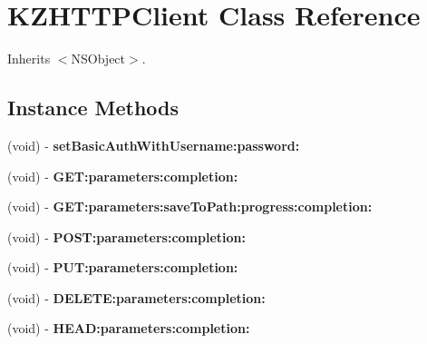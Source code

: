 \hypertarget{interface_k_z_h_t_t_p_client}{\section{K\-Z\-H\-T\-T\-P\-Client Class Reference}
\label{interface_k_z_h_t_t_p_client}
}


Inherits $<$\-N\-S\-Object$>$.

\subsection*{Instance Methods}
\begin{DoxyCompactItemize}
\item 
\hypertarget{interface_k_z_h_t_t_p_client_a88ab431831ad223ab18cbaf95ec7cd7b}{(void) -\/ {\bfseries set\-Basic\-Auth\-With\-Username\-:password\-:}}\label{interface_k_z_h_t_t_p_client_a88ab431831ad223ab18cbaf95ec7cd7b}

\item 
\hypertarget{interface_k_z_h_t_t_p_client_afbcc409f42547d924bf47516f063fa0b}{(void) -\/ {\bfseries G\-E\-T\-:parameters\-:completion\-:}}\label{interface_k_z_h_t_t_p_client_afbcc409f42547d924bf47516f063fa0b}

\item 
\hypertarget{interface_k_z_h_t_t_p_client_a887fe1ad9a5c125fc4b4403c4dc73a7f}{(void) -\/ {\bfseries G\-E\-T\-:parameters\-:save\-To\-Path\-:progress\-:completion\-:}}\label{interface_k_z_h_t_t_p_client_a887fe1ad9a5c125fc4b4403c4dc73a7f}

\item 
\hypertarget{interface_k_z_h_t_t_p_client_a26e3c2f5e711eafce337217e9774a95d}{(void) -\/ {\bfseries P\-O\-S\-T\-:parameters\-:completion\-:}}\label{interface_k_z_h_t_t_p_client_a26e3c2f5e711eafce337217e9774a95d}

\item 
\hypertarget{interface_k_z_h_t_t_p_client_a775adf68ff1a1ecab3ab786a94e89e29}{(void) -\/ {\bfseries P\-U\-T\-:parameters\-:completion\-:}}\label{interface_k_z_h_t_t_p_client_a775adf68ff1a1ecab3ab786a94e89e29}

\item 
\hypertarget{interface_k_z_h_t_t_p_client_a3c0a46264076e18ab62fe0c573a022ca}{(void) -\/ {\bfseries D\-E\-L\-E\-T\-E\-:parameters\-:completion\-:}}\label{interface_k_z_h_t_t_p_client_a3c0a46264076e18ab62fe0c573a022ca}

\item 
\hypertarget{interface_k_z_h_t_t_p_client_a8fe03b2741dd3f68b6ea36c3385d60ca}{(void) -\/ {\bfseries H\-E\-A\-D\-:parameters\-:completion\-:}}\label{interface_k_z_h_t_t_p_client_a8fe03b2741dd3f68b6ea36c3385d60ca}


\end{DoxyCompactItemize}
